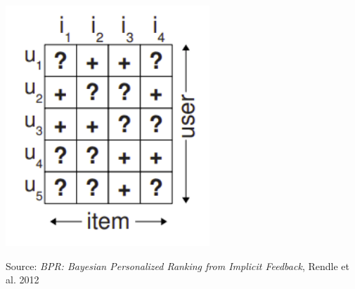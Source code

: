 \documentclass[11pt]{beamer}
\begin{document}
\begin{frame}
\begin{columns}
\begin{column}{0.5\textwidth}
\begin{center}
					\includegraphics[width=\textwidth]{images/implicit.png}
					
					{\tiny Source: \textit{BPR: Bayesian Personalized Ranking from Implicit Feedback}, Rendle et al. 2012}
				\end{center}
			\end{column}
		\end{columns}
	\end{frame}
\end{document}
